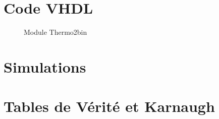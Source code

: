 \newpage
\appendix
\section{Code VHDL}

\begin{figure}[H]
  \tiny
\centering
\begin{varwidth}{\linewidth}
  
\end{varwidth}
\caption{Module Thermo2bin}
\end{figure}

\section{Simulations}

\section{Tables de Vérité et Karnaugh}


